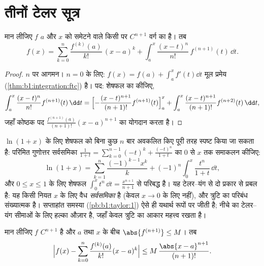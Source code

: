 \section{तीनों टेलर सूत्र}

\begin{theorem}[समाकल शेषफल वाला टेलर]\label{thm:b1:taylor:integral}
मान लीजिए $f$ $a$ और $x$ को समेटने वाले किसी  पर $C^{n+1}$ वर्ग का है।
तब
\[
f(x) = \sum_{k=0}^{n} \frac{f^{(k)}(a)}{k!}\,(x - a)^k
+ \int_a^x \frac{(x - t)^n}{n!}\, f^{(n+1)}(t)\, \dd t .
\]
\end{theorem}

\begin{proof}
$n$ पर आगमन। $n = 0$ के लिए: $f(x) = f(a) + \int_a^x f'(t)\dd t$ मूल प्रमेय
(\cref{thm:b1:integration:ftc}) है। पद: शेषफल का  कीजिए,
\[
\int_a^x \frac{(x-t)^n}{n!} f^{(n+1)}(t)\,\dd t
= \Bigl[-\frac{(x-t)^{n+1}}{(n+1)!} f^{(n+1)}(t)\Bigr]_a^x
+ \int_a^x \frac{(x-t)^{n+1}}{(n+1)!} f^{(n+2)}(t)\,\dd t ,
\]
जहाँ कोष्ठक पद $\frac{f^{(n+1)}(a)}{(n+1)!}(x - a)^{n+1}$ का योगदान करता है।
\end{proof}

\begin{example}\label{ex:b1:taylor:lnexact}
$\ln(1 + x)$ के लिए  शेषफल को बिना कुछ $n$ बार अवकलित किए पूरी तरह
स्पष्ट किया जा सकता है: परिमित गुणोत्तर सर्वसमिका $\frac{1}{1+t} =
\sum_{k=0}^{n-1}(-t)^k + \frac{(-t)^n}{1+t}$ का $0$ से $x$ तक समाकलन कीजिए:
\[
\ln(1 + x) = \sum_{k=1}^{n} \frac{(-1)^{k-1}x^k}{k}
+ (-1)^n \int_0^x \frac{t^n}{1 + t}\,\dd t ,
\]
और $0 \leq x \leq 1$ के लिए शेषफल $\int_0^x t^n\,\dd t =
\frac{x^{n+1}}{n+1}$ से परिबद्ध है। यह टेलर--यंग से दो प्रकार से प्रबल है:
यह किसी नियत $x$ के लिए वैध \emph{सर्वसमिका} है (केवल $x \to 0$ के लिए
नहीं), और त्रुटि का परिबंध संख्यात्मक है। सप्ताहांत समस्या
(\cref{pb:b1:taylor:1}) ऐसे ही यथार्थ रूपों पर जीती है; नीचे का टेलर--यंग
सीमाओं के लिए हल्का औज़ार है, जहाँ केवल त्रुटि का आकार महत्त्व रखता है।
\end{example}

\begin{theorem}[टेलर--लाग्रांज असमिका]\label{thm:b1:taylor:lagrange}
मान लीजिए $f$ $C^{n+1}$ है और $a$ तथा $x$ के बीच $\abs{f^{(n+1)}} \leq M$।
तब
\[
\Bigl| f(x) - \sum_{k=0}^{n} \frac{f^{(k)}(a)}{k!}(x-a)^k \Bigr|
\leq M\, \frac{\abs{x - a}^{n+1}}{(n+1)!} .
\]
\end{theorem}

